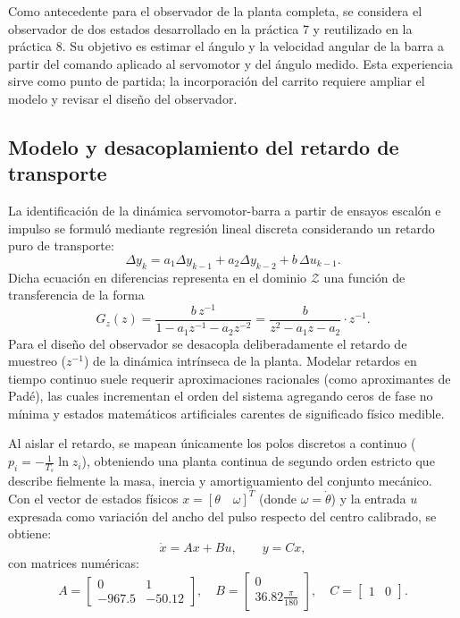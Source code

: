 \documentclass[a4paper, twoside, 10pt, spanish]{article}
\numberwithin{table}{section}
\begin{document}
Como antecedente para el observador de la planta completa, se considera el observador de dos estados desarrollado en la práctica 7 y reutilizado en la práctica 8. Su objetivo es estimar el ángulo y la velocidad angular de la barra a partir del comando aplicado al servomotor y del ángulo medido. Esta experiencia sirve como punto de partida; la incorporación del carrito requiere ampliar el modelo y revisar el diseño del observador.

\subsection{Modelo y desacoplamiento del retardo de transporte}
La identificación de la dinámica servomotor-barra a partir de ensayos escalón e impulso se formuló mediante regresión lineal discreta considerando un retardo puro de transporte:
\begin{equation}
\Delta y_k = a_1\Delta y_{k-1} + a_2\Delta y_{k-2} + b\,\Delta u_{k-1}.
\end{equation}
Dicha ecuación en diferencias representa en el dominio $\mathcal{Z}$ una función de transferencia de la forma
\begin{equation}
G_z(z) = \frac{b\,z^{-1}}{1 - a_1 z^{-1} - a_2 z^{-2}} = \frac{b}{z^2 - a_1 z - a_2} \cdot z^{-1}.
\end{equation}
Para el diseño del observador se desacopla deliberadamente el retardo de muestreo ($z^{-1}$) de la dinámica intrínseca de la planta. Modelar retardos en tiempo continuo suele requerir aproximaciones racionales (como aproximantes de Padé), las cuales incrementan el orden del sistema agregando ceros de fase no mínima y estados matemáticos artificiales carentes de significado físico medible. 

Al aislar el retardo, se mapean únicamente los polos discretos a continuo ($p_i = -\frac{1}{T_s}\ln z_i$), obteniendo una planta continua de segundo orden estricto que describe fielmente la masa, inercia y amortiguamiento del conjunto mecánico. Con el vector de estados físicos $x = [\theta \quad \omega]^T$ (donde $\omega = \dot\theta$) y la entrada $u$ expresada como variación del ancho del pulso respecto del centro calibrado, se obtiene:
\begin{equation}
\dot x = Ax + Bu, \qquad y = Cx,
\end{equation}
con matrices numéricas:
\begin{equation}
A = \begin{bmatrix} 0 & 1 \\ -967.5 & -50.12 \end{bmatrix}, \quad
B = \begin{bmatrix} 0 \\ 36.82\frac{\pi}{180} \end{bmatrix}, \quad
C = \begin{bmatrix} 1 & 0 \end{bmatrix}.
\end{equation}
\end{document}
